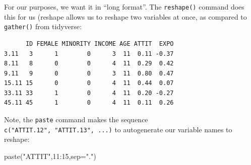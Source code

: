 \documentclass[
  letterpaper,
  DIV=11,
  numbers=noendperiod]{scrreprt}
\newenvironment{Shaded}{\begin{snugshade}}{\end{snugshade}}
\newcommand{\AttributeTok}[1]{\textcolor[rgb]{0.49,0.56,0.16}{#1}}
\newcommand{\CommentTok}[1]{\textcolor[rgb]{0.38,0.63,0.69}{\textit{#1}}}
\newcommand{\DecValTok}[1]{\textcolor[rgb]{0.25,0.63,0.44}{#1}}
\newcommand{\DocumentationTok}[1]{\textcolor[rgb]{0.73,0.13,0.13}{\textit{#1}}}
\newcommand{\FunctionTok}[1]{\textcolor[rgb]{0.02,0.16,0.49}{#1}}
\newcommand{\NormalTok}[1]{\textcolor[rgb]{0.00,0.44,0.13}{#1}}
\newcommand{\OtherTok}[1]{\textcolor[rgb]{0.00,0.44,0.13}{#1}}
\newcommand{\SpecialCharTok}[1]{\textcolor[rgb]{0.25,0.44,0.63}{#1}}
\newcommand{\StringTok}[1]{\textcolor[rgb]{0.25,0.44,0.63}{#1}}
\begin{document}
For our purposes, we want it in ``long format''. The \texttt{reshape()}
command does this for us (reshape allows us to reshape two variables at
once, as compared to \texttt{gather()} from tidyverse:

\begin{Shaded}
\end{Shaded}

\begin{verbatim}
      ID FEMALE MINORITY INCOME AGE ATTIT  EXPO
3.11   3      1        0      3  11  0.11 -0.37
8.11   8      0        0      4  11  0.29  0.42
9.11   9      0        0      3  11  0.80  0.47
15.11 15      0        0      4  11  0.44  0.07
33.11 33      1        0      4  11  0.20 -0.27
45.11 45      1        0      4  11  0.11  0.26
\end{verbatim}

Note, the \texttt{paste} command makes the sequence
\texttt{c("ATTIT.12",\ "ATTIT.13",\ ...)} to autogenerate our variable
names to reshape:

\begin{Shaded}
\begin{Highlighting}[]
\FunctionTok{paste}\NormalTok{(}\StringTok{"ATTIT"}\NormalTok{,}\DecValTok{11}\SpecialCharTok{:}\DecValTok{15}\NormalTok{,}\AttributeTok{sep=}\StringTok{"."}\NormalTok{)}
\end{Highlighting}
\end{Shaded}
\end{document}
